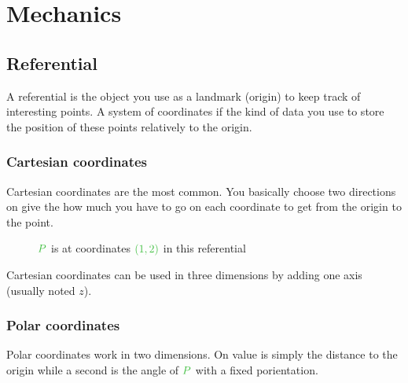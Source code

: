 \chapter{Mechanics}
\banner
{}



\section{Referential}

A referential is the object you use as a landmark (origin) to keep track
of interesting points. A system of coordinates if the kind of data you
use to store the position of these points relatively to the origin.


\subsection{Cartesian coordinates}

Cartesian coordinates are the most common. You basically choose two
directions on give the how much you have to go on each coordinate to
get from the origin to the point.

\begin{figure}[H]
	\centering
	\caption{$\posit{P}$ is at coordinates $\posit{(1,2)}$ in this referential}
\end{figure}

Cartesian coordinates can be used in three dimensions by adding one axis
(usually noted $z$).


\subsection{Polar coordinates}

Polar coordinates work in two dimensions. On value is simply the distance
to the origin while a second is the angle of $\posit{P}$ with a fixed
porientation.

